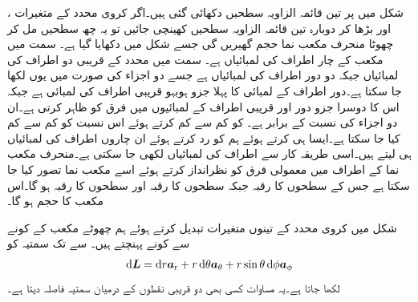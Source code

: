 شکل  میں  پر تین قائمہ الزاویہ  سطحیں دکھائی گئی ہیں۔اگر کروی محدد کے متغیرات ،  اور  بڑھا کر دوبارہ تین قائمہ الزاویہ  سطحیں کھینچی جائیں تو یہ چھ سطحیں مل کر چھوٹا منحرف مکعب نما حجم گھیریں گی جسے شکل  میں دکھایا گیا ہے۔ سمت میں مکعب کے چار اطراف کی لمبائیاں  ہے۔ سمت میں  محدد کے قریبی دو اطراف کی لمبائیاں  جبکہ دو دور اطراف کی لمبائیاں  ہے جسے دو اجزاء کی صورت میں یوں   لکھا جا سکتا ہے۔دور اطراف کے لمبائی کا پہلا جزو ہوبہو قریبی اطراف کی لمبائی ہے جبکہ اس کا دوسرا جزو دور اور قریبی اطراف کے لمبائیوں میں فرق کو ظاہر کرتی ہے۔ان دو اجزاء کی نسبت   کے برابر ہے۔ کو کم سے کم کرتے ہوئے اس نسبت کو کم سے کم کیا جا سکتا  ہے۔ایسا ہی کرتے ہوئے ہم  کو رد کرتے ہوئے ان چاروں اطراف کی لمبائیاں  ہی لیتے ہیں۔اسی طریقہ کار سے   اطراف کی لمبائیاں   لکھی جا سکتی ہے۔منحرف مکعب نما کے اطراف میں معمولی فرق کو نظرانداز کرتے ہوئے اسے مکعب نما تصور کیا جا سکتا ہے جس کے  سطحوں کا رقبہ  جبکہ  سطحوں کا رقبہ  اور  سطحوں کا رقبہ    ہو گا۔اس مکعب کا حجم  ہو گا۔


شکل  میں کروی محدد کے تینوں متغیرات تبدیل کرتے ہوئے ہم چھوٹے مکعب کے   کونے سے
  کونے پہنچتے ہیں۔ سے  تک سمتیہ کو
\begin{align}\label{مساوات_سمتیہ_کروی_چھوٹا_فاصلہ}
\dif \kvec{L}=\dif r \ar+r \dif \theta \atheta+r\sin \theta \dif \phi \aphi
\end{align}
لکھا جاتا ہے۔یہ مساوات کسی بھی دو قریبی نقطوں کے درمیان سمتیہ فاصلہ دیتا ہے۔

